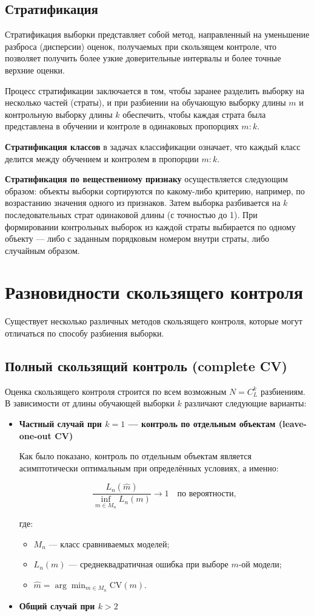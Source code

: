 \subsection{Стратификация}

Стратификация выборки представляет собой метод, направленный на уменьшение разброса (дисперсии) оценок, получаемых при скользящем контроле, что позволяет получить более узкие доверительные интервалы и более точные верхние оценки.

Процесс стратификации заключается в том, чтобы заранее разделить выборку на несколько частей (страты), и при разбиении на обучающую выборку длины $m$ и контрольную выборку длины $k$ обеспечить, чтобы каждая страта была представлена в обучении и контроле в одинаковых пропорциях $m:k$.

\textbf{Стратификация классов} в задачах классификации означает, что каждый класс делится между обучением и контролем в пропорции $m:k$.

\textbf{Стратификация по вещественному признаку} осуществляется следующим образом: объекты выборки сортируются по какому-либо критерию, например, по возрастанию значения одного из признаков. Затем выборка разбивается на $k$ последовательных страт одинаковой длины (с точностью до 1). При формировании контрольных выборок из каждой страты выбирается по одному объекту — либо с заданным порядковым номером внутри страты, либо случайным образом.


\section{Разновидности скользящего контроля}
Существует несколько различных методов скользящего контроля, которые могут отличаться по способу разбиения выборки.
\subsection{Полный скользящий контроль (complete CV)}
Оценка скользящего контроля строится по всем возможным $N = C_L^k$ разбиениям. В зависимости от длины обучающей выборки $k$ различают следующие варианты:
\begin{itemize}

\item \textbf{Частный случай при $k=1$ — контроль по отдельным объектам (leave-one-out CV)}

Как было показано, контроль по отдельным объектам является асимптотически оптимальным при определённых условиях, а именно:

\[
\frac{L_n(\hat{m})}{\inf_{m \in M_n} L_n(m)} \to 1 \quad \text{по вероятности},
\]

где:

\begin{itemize}
  \item $M_n$ — класс сравниваемых моделей;
  \item $L_n(m)$ — среднеквадратичная ошибка при выборе $m$-ой модели;
  \item $\hat{m} = \arg \min_{m \in M_n} \text{CV}(m)$.
\end{itemize}

\item \textbf{Общий случай при $k>2$}
\end{itemize}

